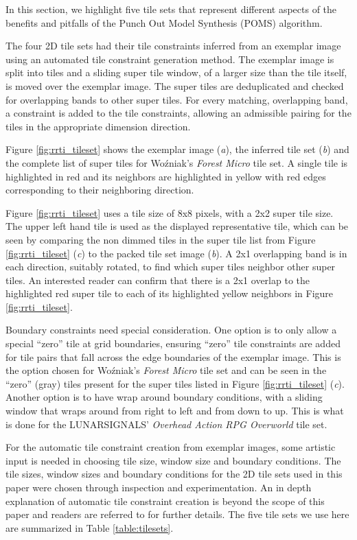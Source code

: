 In this section, we highlight five tile sets that represent different aspects of the
benefits and pitfalls of the Punch Out Model Synthesis (POMS) algorithm.

The four 2D tile sets had their tile constraints inferred from an exemplar image using
an automated tile constraint generation method.
The exemplar image is split into tiles and a sliding super tile window, of a larger size than the tile itself, is moved over the exemplar image.
The super tiles are deduplicated and checked for overlapping bands to other super tiles.
For every matching, overlapping band, a constraint is added to the tile constraints, allowing an admissible pairing for the tiles in the
appropriate dimension direction.

Figure \ref{fig:rrti_tileset} shows the exemplar image (\textit{a}), the inferred tile set (\textit{b}) and the complete list of super tiles
for Wo\'zniak's \textit{Forest Micro} tile set.
A single tile is highlighted in red and its neighbors are highlighted in yellow with red edges corresponding to their neighboring direction.

Figure \ref{fig:rrti_tileset} uses a tile size of 8x8 pixels, with a 2x2 super tile size.
The upper left hand tile is used as the displayed representative tile, which can be seen by comparing the non dimmed tiles in the
super tile list from Figure \ref{fig:rrti_tileset} (\textit{c}) to the packed tile set image (\textit{b}).
A 2x1 overlapping band is in each direction, suitably rotated, to find which super tiles neighbor other super tiles.
An interested reader can confirm that there is a 2x1 overlap to the highlighted red super tile to each of its highlighted yellow neighbors
in Figure \ref{fig:rrti_tileset}.

Boundary constraints need special consideration.
One option is to only allow a special ``zero'' tile at grid boundaries, ensuring ``zero'' tile constraints are added
for tile pairs that fall across the edge boundaries of the exemplar image.
This is the option chosen for Wo\'zniak's \textit{Forest Micro} tile set and can be seen in the ``zero'' (gray) tiles present for
the super tiles listed in Figure \ref{fig:rrti_tileset} (\textit{c}).
Another option is to have wrap around boundary conditions, with a sliding window that wraps around from right to left and from down to up.
This is what is done for the LUNARSIGNALS' \textit{Overhead Action RPG Overworld} tile set.

For the automatic tile constraint creation from exemplar images, some artistic input is needed in choosing tile size, window size and boundary conditions.
The tile sizes, window sizes and boundary conditions for the 2D tile sets used in this paper were chosen through inspection and experimentation.
An in depth explanation of automatic tile constraint creation is beyond the scope of this paper and readers are referred to \cite{Gumin_2016, Sherratt_2019, BorisTheBrave_wfc_2021} for further details.
The five tile sets we use here are summarized in Table \ref{table:tilesets}.

